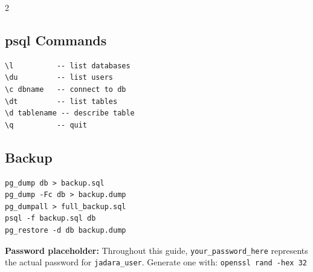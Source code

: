 \documentclass[11pt,a4paper]{article}
\begin{document}
\begin{multicols}{2}

\subsection*{psql Commands}
\begin{lstlisting}[style=shell,numbers=none]
\l          -- list databases
\du         -- list users
\c dbname   -- connect to db
\dt         -- list tables
\d tablename -- describe table
\q          -- quit
\end{lstlisting}

\columnbreak

\subsection*{Backup}
\begin{lstlisting}[style=shell,numbers=none]
pg_dump db > backup.sql
pg_dump -Fc db > backup.dump
pg_dumpall > full_backup.sql
psql -f backup.sql db
pg_restore -d db backup.dump
\end{lstlisting}

\end{multicols}

\vspace{1em}

\begin{notebox}
\textbf{Password placeholder:} Throughout this guide, \texttt{your\_password\_here} represents the actual password for \texttt{jadara\_user}. Generate one with: \texttt{openssl rand -hex 32}
\end{notebox}
\end{document}
